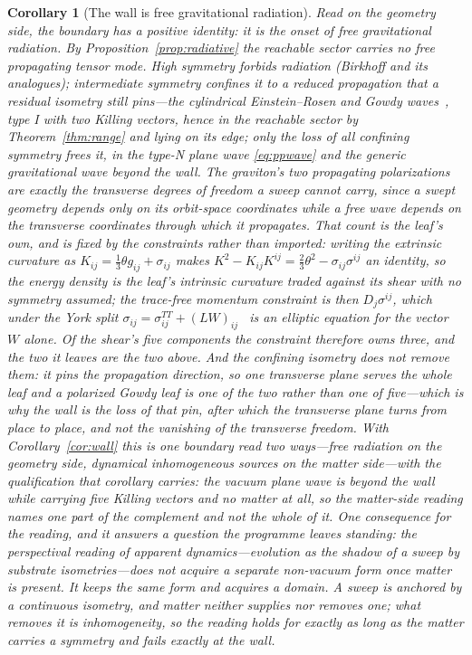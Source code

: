 \documentclass[11pt,a4paper]{article}
\newtheorem{corollary}[theorem]{Corollary}
\theoremstyle{definition}
\begin{document}
\begin{corollary}[The wall is free gravitational radiation]\label{cor:radiation}
Read on the geometry side, the boundary has a positive identity: it is the onset of free gravitational radiation. By Proposition~\ref{prop:radiative} the reachable sector carries no free propagating tensor mode. High symmetry forbids radiation (Birkhoff and its analogues); intermediate symmetry confines it to a reduced propagation that a residual isometry still pins---the cylindrical Einstein--Rosen and Gowdy waves~\cite{EinsteinRosen1937,Gowdy1971}, type I with two Killing vectors, hence in the reachable sector by Theorem~\ref{thm:range} and lying on its edge; only the loss of all confining symmetry frees it, in the type-N plane wave \eqref{eq:ppwave} and the generic gravitational wave beyond the wall. The graviton's two propagating polarizations are exactly the transverse degrees of freedom a sweep cannot carry, since a swept geometry depends only on its orbit-space coordinates while a free wave depends on the transverse coordinates through which it propagates. \emph{That count is the leaf's own, and is fixed by the constraints rather than imported}: writing the extrinsic curvature as $K_{ij}=\tfrac13\theta g_{ij}+\sigma_{ij}$ makes $K^2-K_{ij}K^{ij}=\tfrac23\theta^2-\sigma_{ij}\sigma^{ij}$ an identity, so the energy density is the leaf's intrinsic curvature traded against its shear with no symmetry assumed; the trace-free momentum constraint is then $D_j\sigma^{ij}$, which under the York split $\sigma_{ij}=\sigma^{TT}_{ij}+(LW)_{ij}$~\cite{York1973} is an elliptic equation for the vector $W$ alone. \emph{Of the shear's five components the constraint therefore owns three, and the two it leaves are the two above}. \emph{And the confining isometry does not remove them}: it pins the propagation direction, so one transverse plane serves the whole leaf and a polarized Gowdy leaf is one of the two rather than one of five---which is why the wall is the loss of that pin, after which the transverse plane turns from place to place, and not the vanishing of the transverse freedom. With Corollary~\ref{cor:wall} this is one boundary read two ways---free radiation on the geometry side, dynamical inhomogeneous sources on the matter side---\emph{with the qualification that corollary carries}: the vacuum plane wave is beyond the wall while carrying five Killing vectors and no matter at all, so the matter-side reading names one part of the complement and not the whole of it. \emph{One consequence for the reading, and it answers a question the programme leaves standing}: the perspectival reading of apparent dynamics---evolution as the shadow of a sweep by substrate isometries---does not acquire a separate non-vacuum form once matter is present. It keeps the same form and acquires a \emph{domain}. A sweep is anchored by a continuous isometry, and matter neither supplies nor removes one; what removes it is inhomogeneity, so the reading holds for exactly as long as the matter carries a symmetry and fails exactly at the wall. 


\end{corollary}
\end{document}
